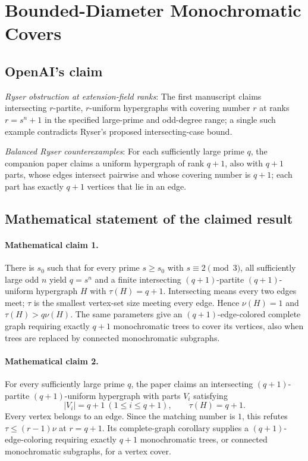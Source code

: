 \documentclass[11pt]{article}
\begin{document}
\section*{Bounded-Diameter Monochromatic Covers}

\subsection{OpenAI's claim}
\textit{Ryser obstruction at extension-field ranks}: The first manuscript claims intersecting $r$-partite, $r$-uniform hypergraphs with covering number $r$ at ranks $r=s^n+1$ in the specified large-prime and odd-degree range; a single such example contradicts Ryser’s proposed intersecting-case bound.

\textit{Balanced Ryser counterexamples}: For each sufficiently large prime $q$, the companion paper claims a uniform hypergraph of rank $q+1$, also with $q+1$ parts, whose edges intersect pairwise and whose covering number is $q+1$; each part has exactly $q+1$ vertices that lie in an edge.

\subsection{Mathematical statement of the claimed result}
\paragraph{Mathematical claim 1.} There is $s_0$ such that for every prime $s\ge s_0$ with $s\equiv2\pmod3$, all sufficiently large odd $n$ yield $q=s^n$ and a finite intersecting $(q+1)$-partite $(q+1)$-uniform hypergraph $H$ with $\tau(H)=q+1$. Intersecting means every two edges meet; $\tau$ is the smallest vertex-set size meeting every edge. Hence $\nu(H)=1$ and $\tau(H)>q\nu(H)$. The same parameters give an $(q+1)$-edge-colored complete graph requiring exactly $q+1$ monochromatic trees to cover its vertices, also when trees are replaced by connected monochromatic subgraphs.

\paragraph{Mathematical claim 2.} For every sufficiently large prime $q$, the paper claims an intersecting $(q+1)$-partite $(q+1)$-uniform hypergraph with parts $V_i$ satisfying \[|V_i|=q+1\ (1\le i\le q+1),\qquad\tau(H)=q+1.\] Every vertex belongs to an edge. Since the matching number is $1$, this refutes $\tau\le(r-1)\nu$ at $r=q+1$. Its complete-graph corollary supplies a $(q+1)$-edge-coloring requiring exactly $q+1$ monochromatic trees, or connected monochromatic subgraphs, for a vertex cover.
\end{document}
